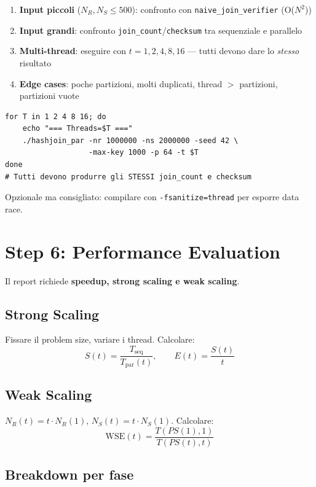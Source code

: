 \documentclass[11pt,a4paper]{article}
\begin{document}
\begin{enumerate}
  \item \textbf{Input piccoli} ($N_R, N_S \leq 500$): confronto con \texttt{naive\_join\_verifier} (O($N^2$))
  \item \textbf{Input grandi}: confronto \texttt{join\_count}/\texttt{checksum} tra sequenziale e parallelo
  \item \textbf{Multi-thread}: eseguire con $t = 1, 2, 4, 8, 16$ --- tutti devono dare lo \emph{stesso} risultato
  \item \textbf{Edge cases}: poche partizioni, molti duplicati, thread $>$ partizioni, partizioni vuote
\end{enumerate}

\begin{lstlisting}[style=bash,caption={Script di validazione}]
for T in 1 2 4 8 16; do
    echo "=== Threads=$T ==="
    ./hashjoin_par -nr 1000000 -ns 2000000 -seed 42 \
                   -max-key 1000 -p 64 -t $T
done
# Tutti devono produrre gli STESSI join_count e checksum
\end{lstlisting}

Opzionale ma consigliato: compilare con \texttt{-fsanitize=thread} per esporre data race.


\section{Step 6: Performance Evaluation}

Il report richiede \textbf{speedup, strong scaling e weak scaling}.

\subsection{Strong Scaling}
Fissare il problem size, variare i thread. Calcolare:
\[
S(t) = \frac{T_{\text{seq}}}{T_{\text{par}}(t)}, \qquad E(t) = \frac{S(t)}{t}
\]

\subsection{Weak Scaling}
$N_R(t) = t \cdot N_R(1)$, $N_S(t) = t \cdot N_S(1)$. Calcolare:
\[
\text{WSE}(t) = \frac{T(PS(1),1)}{T(PS(t),t)}
\]

\subsection{Breakdown per fase}
\end{document}

